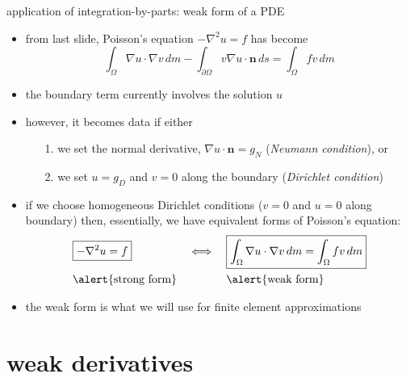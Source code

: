 \documentclass[10pt,
               svgnames,
               hyperref={colorlinks,
                         citecolor=DeepPink4,
                         linkcolor=FireBrick,
                         urlcolor=blue},
               usepdftitle=false]{beamer}
\newcommand{\bn}{\mathbf{n}}
\newcommand{\grad}{\nabla}
\begin{document}
\begin{frame}{application of integration-by-parts: weak form of a PDE}

\begin{itemize}
\item from last slide, Poisson's equation $-\grad^2 u = f$ has become
	$$\int_\Omega \grad u\cdot \grad v\,dm - \int_{\partial \Omega} v \grad u\cdot \bn\,ds = \int_\Omega f v\,dm$$
\item the boundary term currently involves the solution $u$
\item however, it becomes data if either
    \begin{itemize}
    \item[1.] we set the normal derivative, $\grad u\cdot\bn=g_N$ (\emph{Neumann condition}), or
    \item[2.] we set $u=g_D$ and $v=0$ along the boundary (\emph{Dirichlet condition})
    \end{itemize}
\item if we choose homogeneous Dirichlet conditions ($v=0$ and $u=0$ along boundary) then, essentially, we have equivalent forms of Poisson's equation:
\begin{align*}
&\boxed{-\grad^2 u = f} &\iff &&&\boxed{\int_\Omega \grad u\cdot \grad v\,dm = \int_\Omega f v\,dm} \\
&\text{\alert{strong form}} & &&&\text{\alert{weak form}}
\end{align*}
\item the weak form is what we will use for finite element approximations
\end{itemize}
\end{frame}


\section{weak derivatives}
\end{document}
